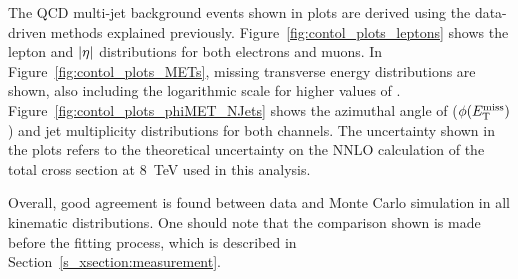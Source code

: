 The QCD multi-jet background events shown in plots are derived using the data-driven methods explained previously.
Figure~\ref{fig:contol_plots_leptons} shows the lepton \pt and $\lvert \eta \rvert$ distributions for both electrons and muons.
In Figure~\ref{fig:contol_plots_METs}, missing transverse energy distributions are shown, also including the
logarithmic scale for higher values of \MET. Figure~\ref{fig:contol_plots_phiMET_NJets} shows the azimuthal angle of
\MET ($\phi(E_{\mathrm{T}}^{\textrm{miss}})$) and jet multiplicity distributions for both channels. The \ttbar uncertainty shown in the plots
refers to the theoretical uncertainty on the NNLO calculation of the total \ttbar cross section at \SI{8}{\TeV}
\autocite{NNLO_ttbar} used in this analysis.

Overall, good agreement is found between data and Monte Carlo simulation in all kinematic distributions. One should note
that the comparison shown is made before the fitting process, which is described in
Section~\ref{s_xsection:measurement}.




